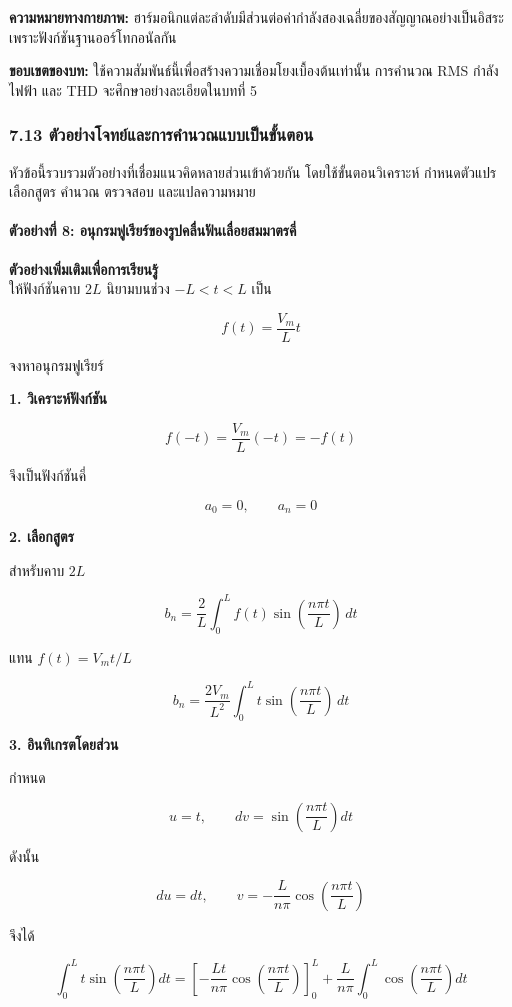 \textbf{ความหมายทางกายภาพ:} ฮาร์มอนิกแต่ละลำดับมีส่วนต่อค่ากำลังสองเฉลี่ยของสัญญาณอย่างเป็นอิสระ เพราะฟังก์ชันฐานออร์โทกอนัลกัน

\textbf{ขอบเขตของบท:} ใช้ความสัมพันธ์นี้เพื่อสร้างความเชื่อมโยงเบื้องต้นเท่านั้น การคำนวณ RMS กำลังไฟฟ้า และ THD จะศึกษาอย่างละเอียดในบทที่ 5

\subsubsection{7.13 ตัวอย่างโจทย์และการคำนวณแบบเป็นขั้นตอน}

หัวข้อนี้รวบรวมตัวอย่างที่เชื่อมแนวคิดหลายส่วนเข้าด้วยกัน โดยใช้ขั้นตอนวิเคราะห์ กำหนดตัวแปร เลือกสูตร คำนวณ ตรวจสอบ และแปลความหมาย

\paragraph{ตัวอย่างที่ 8: อนุกรมฟูเรียร์ของรูปคลื่นฟันเลื่อยสมมาตรคี่}

\textbf{ตัวอย่างเพิ่มเติมเพื่อการเรียนรู้}\\
ให้ฟังก์ชันคาบ \(2L\) นิยามบนช่วง \(-L<t<L\) เป็น

\[
f(t)=\frac{V_m}{L}t
\]

จงหาอนุกรมฟูเรียร์

\textbf{1. วิเคราะห์ฟังก์ชัน}

\[
f(-t)=\frac{V_m}{L}(-t)=-f(t)
\]

จึงเป็นฟังก์ชันคี่

\[
a_0=0,\qquad a_n=0
\]

\textbf{2. เลือกสูตร}

สำหรับคาบ \(2L\)

\[
b_n=\frac{2}{L}\int_0^L f(t)\sin\left(\frac{n\pi t}{L}\right)\,dt
\]

แทน \(f(t)=V_mt/L\)

\[
b_n=\frac{2V_m}{L^2}\int_0^L t\sin\left(\frac{n\pi t}{L}\right)\,dt
\]

\textbf{3. อินทิเกรตโดยส่วน}

กำหนด

\[
u=t,\qquad dv=\sin\left(\frac{n\pi t}{L}\right)dt
\]

ดังนั้น

\[
du=dt,
\qquad
v=-\frac{L}{n\pi}\cos\left(\frac{n\pi t}{L}\right)
\]

จึงได้

\[
\int_0^L t\sin\left(\frac{n\pi t}{L}\right)dt
=
\left[-\frac{Lt}{n\pi}\cos\left(\frac{n\pi t}{L}\right)\right]_0^L
+\frac{L}{n\pi}\int_0^L\cos\left(\frac{n\pi t}{L}\right)dt
\]

